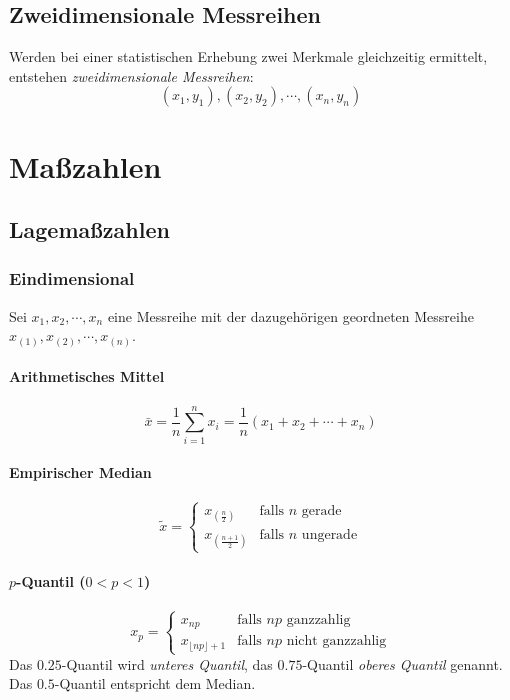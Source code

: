 		\subsection{Zweidimensionale Messreihen}
			Werden bei einer statistischen Erhebung zwei Merkmale gleichzeitig ermittelt, entstehen \textit{zweidimensionale Messreihen}:
			\begin{equation*}
				(x_1, y_1), (x_2, y_2), \cdots, (x_n, y_n)
			\end{equation*}

	\section{Maßzahlen}
		\subsection{Lagemaßzahlen}
			\subsubsection{Eindimensional}
				Sei \( x_1, x_2, \cdots, x_n \) eine Messreihe mit der dazugehörigen geordneten Messreihe \( x_{(1)}, x_{(2)}, \cdots, x_{(n)} \).

				\paragraph{Arithmetisches Mittel}
					\begin{equation*}
						\bar{x} = \frac{1}{n} \sum_{i=1}^n x_i = \frac{1}{n} (x_1 + x_2 + \cdots + x_n)
					\end{equation*}

				\paragraph{Empirischer Median}
					\begin{equation*}
						\tilde{x} =
						\begin{cases}
							x_{(\frac{n}{2})}   & \textrm{falls } n \textrm{ gerade}   \\
							x_{(\frac{n+1}{2})} & \textrm{falls } n \textrm{ ungerade}
						\end{cases}
					\end{equation*}

				\paragraph{\(p\)-Quantil (\(0 < p < 1\))}
					\begin{equation*}
						x_p =
						\begin{cases}
							x_{np}                     & \textrm{falls } np \textrm{ ganzzahlig}       \\
							x_{\lfloor np \rfloor + 1} & \textrm{falls } np \textrm{ nicht ganzzahlig}
						\end{cases}
					\end{equation*}
					Das \(0.25\)-Quantil wird \textit{unteres Quantil}, das \(0.75\)-Quantil \textit{oberes Quantil} genannt. Das \(0.5\)-Quantil entspricht dem Median.

